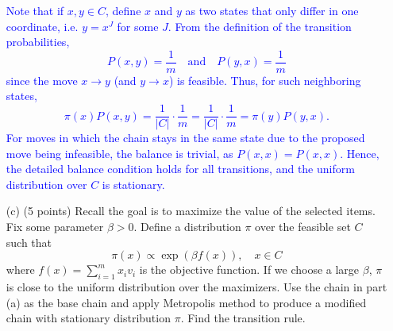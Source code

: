 \documentclass{article}
\begin{document}
\begin{itemize}
    \textcolor{blue}{
Note that if \( x,y \in C \), define $x$ and $y$ as two states that only differ in one coordinate, i.e. \( y = x^J \) for some \( J \). From the definition of the transition probabilities,
\[
P(x,y) = \frac{1}{m} \quad \text{and} \quad P(y,x) = \frac{1}{m}
\]
since the move \( x \to y \) (and \( y \to x \)) is feasible. Thus, for such neighboring states,
\[
\pi(x)P(x,y) = \frac{1}{|C|} \cdot \frac{1}{m} = \frac{1}{|C|} \cdot \frac{1}{m} = \pi(y)P(y,x).
\]
For moves in which the chain stays in the same state due to the proposed move being infeasible, the balance is trivial, as $P(x,x)=P(x,x)$. Hence, the detailed balance condition holds for all transitions, and the uniform distribution over \( C \) is stationary.
    }
    
    \item[(c)] (5 points) Recall the goal is to maximize the value of the selected items. Fix some parameter $\beta > 0$. Define a distribution $\pi$ over the feasible set $C$ such that
    \[
    \pi(x) \propto \exp(\beta f(x)), \quad x \in C
    \]
where $f(x) = \sum_{i=1}^{m} x_i v_i$ is the objective function. If we choose a large $\beta$, $\pi$ is close to the uniform distribution over the maximizers. Use the chain in part (a) as the base chain and apply Metropolis method to produce a modified chain with stationary distribution $\pi$. Find the transition rule.


\end{itemize}
\end{document}
